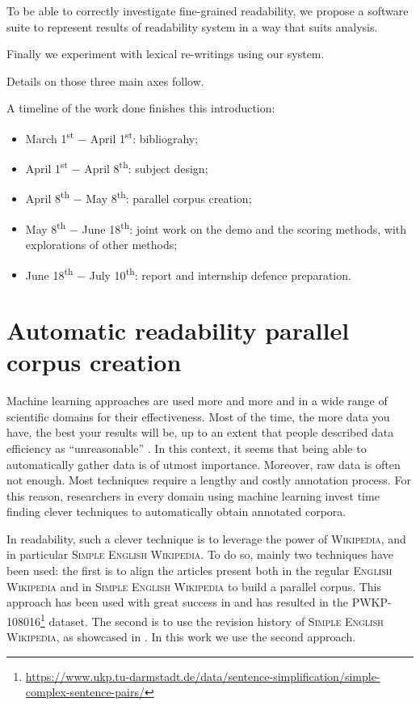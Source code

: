 \documentclass[a4paper, 11pt, onepage]{scrreprt}
\newcommand\wiki{\textsc{Wikipedia}}
\newcommand\ew{\textsc{English Wikipedia}}
\newcommand\sew{\textsc{Simple English Wikipedia}}
\begin{document}
To be able to correctly investigate fine-grained readability, we
propose a software suite to represent results of readability system in
a way that suits analysis.

Finally we experiment with lexical re-writings using our system.

Details on those three main axes follow.

A timeline of the work done finishes this introduction:

\begin{itemize}
\item March 1\textsuperscript{st} − April 1\textsuperscript{st}:
  bibliograhy;
\item April 1\textsuperscript{st} − April 8\textsuperscript{th}:
  subject design;
\item April 8\textsuperscript{th} − May 8\textsuperscript{th}:
  parallel corpus creation;
\item May 8\textsuperscript{th} − June 18\textsuperscript{th}:
  joint work on the demo and the scoring methods, with explorations of
  other methods;
\item June 18\textsuperscript{th} − July 10\textsuperscript{th}:
  report and internship defence preparation.
\end{itemize}

\section{Automatic readability parallel corpus creation}
\label{sec:corpus}

Machine learning approaches are used more and more and in a wide range
of scientific domains for their effectiveness. Most of the time, the
more data you have, the best your results will be, up to an extent
that people described data efficiency as “unreasonable”
\cite{halevy2009unreasonable}. In this context, it seems that being
able to automatically gather data is of utmost importance. Moreover,
raw data is often not enough. Most techniques require a lengthy and
costly annotation process. For this reason, researchers in every
domain using machine learning invest time finding clever techniques to
automatically obtain annotated corpora.

In readability, such a clever technique is to leverage the power of
\wiki, and in particular \sew. To do so, mainly two techniques have
been used: the first is to align the articles present both in the
regular \ew{} and in \sew{} to build a parallel corpus. This approach
has been used with great success in
\cite{zhu-bernhard-gurevych:2010:PAPERS} and has resulted in the
\textsc{PWKP-108016}\footnote{\url{https://www.ukp.tu-darmstadt.de/data/sentence-simplification/simple-complex-sentence-pairs/}}
dataset. The second is to use the revision history of \sew, as
showcased in \cite{yatskar2010sake}. In this work we use the second
approach.
\end{document}

